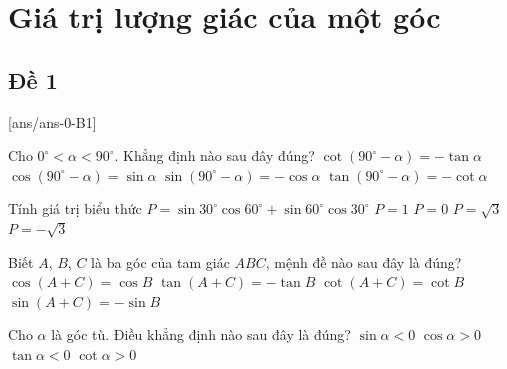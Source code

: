 \section{Giá trị lượng giác của một góc}

\subsection{Đề 1}
[ans/ans-0-B1]
\caulc
\begin{ex}%
	Cho $0^{\circ}  < \alpha < 90^{\circ} $. Khẳng định nào sau đây đúng?
	\choice
	{$\cot \left(90^{\circ} -\alpha \right)=-\tan \alpha$}
	{\True $\cos \left(90^{\circ} -\alpha \right)=\sin \alpha$}
	{$\sin \left(90^{\circ} -\alpha \right)=-\cos \alpha$}
	{$\tan \left(90^{\circ} -\alpha \right)=-\cot \alpha$}
\end{ex}%
\begin{ex}
	Tính giá trị biểu thức $P=\sin 30^{\circ} \cos 60^{\circ}+\sin 60^{\circ} \cos 30^{\circ}$
	\choice
	{\True $P=1$}
	{$P=0$}
	{$P=\sqrt{3}$}
	{$P=-\sqrt{3}$}
\end{ex}
\begin{ex}%
	Biết $A$, $B$, $C$ là ba góc của tam giác $ABC$, mệnh đề nào sau đây là đúng?
	\choice
	{$\cos \left(A+C\right)=\cos B$}
	{\True $\tan \left(A+C\right)=-\tan B$}
	{$\cot \left(A+C\right)=\cot B$}
	{$\sin \left(A+C\right)=-\sin B$}
\end{ex}


\begin{ex}%
	Cho $\alpha$ là góc tù. Điều khẳng định nào sau đây là đúng?
	\choice
	{$\sin \alpha < 0$}
	{$\cos \alpha > 0$}
	{\True $\tan \alpha < 0$}
	{$\cot \alpha > 0$}
\end{ex}

